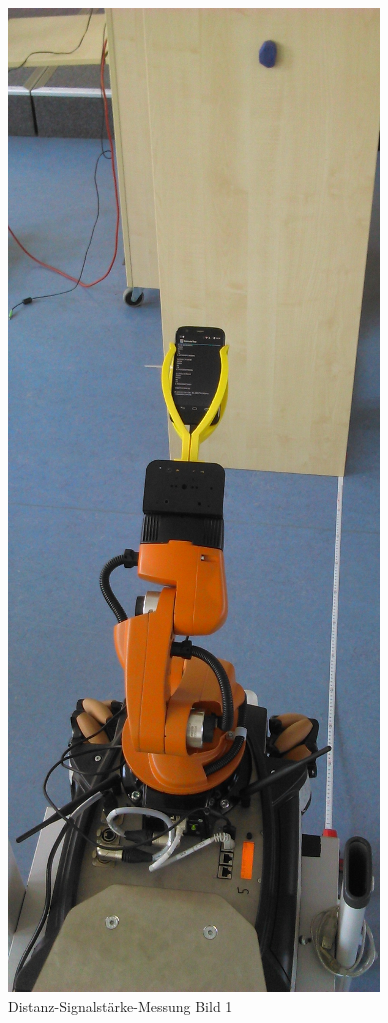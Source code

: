 \begin{figure}[H] 
\centering
\includegraphics[scale=0.3]{Bilder/MessungDistanz1}
\caption{Distanz-Signalstärke-Messung Bild 1}
\end{figure}
